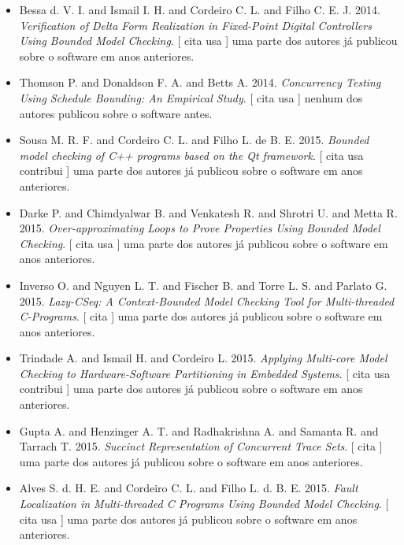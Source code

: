 \begin{itemize}
\item Bessa d. V. I. and Ismail I. H. and Cordeiro C. L. and Filho C. E. J.
      2014.
        \textit{ Verification of Delta Form Realization in Fixed-Point Digital Controllers Using Bounded Model Checking}.
      [
          cita
          usa
      ]
uma parte dos autores já publicou sobre o software em anos anteriores.
\item Thomson P. and Donaldson F. A. and Betts A.
      2014.
        \textit{ Concurrency Testing Using Schedule Bounding: An Empirical Study}.
      [
          cita
          usa
      ]
nenhum dos autores publicou sobre o software antes.
\item Sousa M. R. F. and Cordeiro C. L. and Filho L. de B. E.
      2015.
        \textit{ Bounded model checking of C++ programs based on the Qt framework}.
      [
          cita
          usa
          contribui
      ]
uma parte dos autores já publicou sobre o software em anos anteriores.
\item Darke P. and Chimdyalwar B. and Venkatesh R. and Shrotri U. and Metta R.
      2015.
        \textit{ Over-approximating Loops to Prove Properties Using Bounded Model Checking}.
      [
          cita
          usa
      ]
uma parte dos autores já publicou sobre o software em anos anteriores.
\item Inverso O. and Nguyen L. T. and Fischer B. and Torre L. S. and Parlato G.
      2015.
        \textit{ Lazy-CSeq: A Context-Bounded Model Checking Tool for Multi-threaded C-Programs}.
      [
          cita
      ]
uma parte dos autores já publicou sobre o software em anos anteriores.
\item Trindade A. and Ismail H. and Cordeiro L.
      2015.
        \textit{ Applying Multi-core Model Checking to Hardware-Software Partitioning in Embedded Systems}.
      [
          cita
          usa
          contribui
      ]
uma parte dos autores já publicou sobre o software em anos anteriores.
\item Gupta A. and Henzinger A. T. and Radhakrishna A. and Samanta R. and Tarrach T.
      2015.
        \textit{ Succinct Representation of Concurrent Trace Sets}.
      [
          cita
      ]
uma parte dos autores já publicou sobre o software em anos anteriores.
\item Alves S. d. H. E. and Cordeiro C. L. and Filho L. d. B. E.
      2015.
        \textit{ Fault Localization in Multi-threaded C Programs Using Bounded Model Checking}.
      [
          cita
          usa
      ]
uma parte dos autores já publicou sobre o software em anos anteriores.

\end{itemize}
